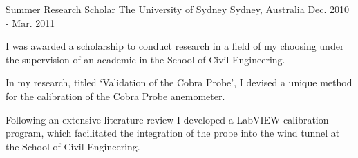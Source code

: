 \begin{cventries}
  \cventry
    {Summer Research Scholar} %
    {The University of Sydney} %
    {Sydney, Australia} %
    {Dec. 2010 - Mar. 2011} %
    {
      \begin{cvitems} %
        \item {I was awarded a scholarship to conduct research in a field of my choosing under the supervision of an academic in the School of Civil Engineering.} 
        \item {In my research, titled ‘Validation of the Cobra Probe’, I devised a unique method for the calibration of the Cobra Probe anemometer.} 
        \item {Following an extensive literature review I developed a LabVIEW calibration program, which facilitated the integration of the probe into the wind tunnel at the School of Civil Engineering.}
      \end{cvitems}
    }

\end{cventries}
